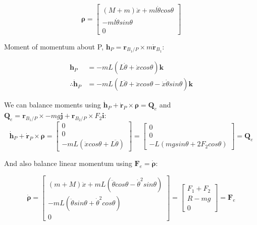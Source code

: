 \documentclass[12pt]{report}
\begin{document}
\begin{equation*}
\boldsymbol{\rho} = 
\begin{bmatrix} (M+m)\dot{x} + ml\dot{\theta}cos{\theta} \\ -ml\dot{\theta}sin{\theta} \\ 0 \end{bmatrix} 
\end{equation*}

Moment of momentum about P, $\boldsymbol{h}_P = \boldsymbol{r}_{B_1/P} \times m\boldsymbol{\dot{r}}_{B_1}$:

\begin{align*}
\boldsymbol{h}_P & = -mL(L\dot{\theta} + \dot{x}cos\theta) \boldsymbol{k} \\
\therefore \boldsymbol{\dot{h}}_P & = -mL(L\ddot{\theta} + \ddot{x}cos\theta - \dot{x}\dot{\theta}sin\theta) \boldsymbol{k}
\end{align*}

We can balance moments using $\boldsymbol{\dot{h}}_P + \boldsymbol{\dot{r}}_P \times \boldsymbol{\rho} = \boldsymbol{Q}_{e}$ and $ \boldsymbol{Q}_{e} = \boldsymbol{r}_{B_1/P} \times -mg\boldsymbol{j} + \boldsymbol{r}_{B_2/P} \times F_2 \boldsymbol{i}$:
\begin{equation*}
\boldsymbol{\dot{h}}_P + \boldsymbol{\dot{r}}_P \times \boldsymbol{\rho} = 
\begin{bmatrix} 0 \\ 0 \\ -mL(\ddot{x} cos\theta + L\ddot{\theta}) \end{bmatrix} = \begin{bmatrix} 0 \\ 0 \\ -L(mgsin\theta + 2 F_2 cos \theta) \end{bmatrix} = \boldsymbol{Q}_e
\end{equation*}

And also balance linear momentum using $\boldsymbol{F}_e = \dot{\boldsymbol{\rho}}$:

\begin{equation*}
    \dot{\boldsymbol{\rho}} = \begin{bmatrix} (m+M)\ddot{x} + mL(\ddot{\theta}cos\theta - \dot{\theta}^2 sin\theta) \\ -mL(\ddot{\theta}sin\theta + \dot{\theta}^2 cos\theta) \\ 0 \end{bmatrix}
    = \begin{bmatrix} F_1 + F_2 \\ R-mg \\ 0 \end{bmatrix} = \boldsymbol{F}_e
\end{equation*}
\end{document}
